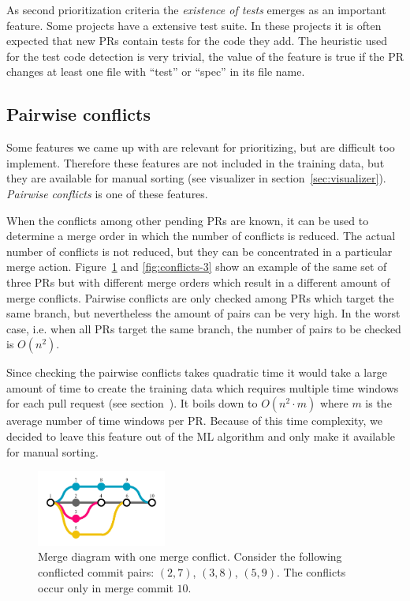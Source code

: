 \documentclass[conference]{IEEEtran}
\begin{document}
As second prioritization criteria the \emph{existence of tests} emerges as an important feature.
Some projects have a extensive test suite.
In these projects it is often expected that new PRs contain tests for the code they add.
The heuristic used for the test code detection is very trivial, the value of the feature is true if the PR changes at least one file with ``test'' or ``spec'' in its file name.

\subsection{Pairwise conflicts}
\label{sec:pairwise}

Some features we came up with are relevant for prioritizing, but are difficult too implement.
Therefore these features are not included in the training data, but they are available for manual sorting (see visualizer in section~\ref{sec:visualizer}).
\emph{Pairwise conflicts} is one of these features.

When the conflicts among other pending PRs are known, it can be used to determine a merge order in which the number of conflicts is reduced.
The actual number of conflicts is not reduced, but they can be concentrated in a particular merge action.
Figure~\ref{fig:conflicts-1} and \ref{fig:conflicts-3} show an example of the same set of three PRs but with different merge orders which result in a different amount of merge conflicts.
Pairwise conflicts are only checked among PRs which target the same branch, but nevertheless the amount of pairs can be very high.
In the worst case, i.e. when all PRs target the same branch, the number of pairs to be checked is $O(n^2)$.

Since checking the pairwise conflicts takes quadratic time it would take a large amount of time to create the training data which requires multiple time windows for each pull request (see section~\label{sec:training}).
It boils down to $O(n^2 \cdot m)$ where $m$ is the average number of time windows per PR.
Because of this time complexity, we decided to leave this feature out of the ML algorithm and only make it available for manual sorting.

\begin{figure}
  \centering
  \includegraphics[height=25mm, clip ,trim = 0mm 7mm 0mm 7mm]{../figs/conflicts-1.pdf}
  \caption[Merge diagram with one conflict]
   {Merge diagram with one merge conflict.
   Consider the following conflicted commit pairs: $(2,7)$, $(3,8)$, $(5,9)$.
   The conflicts occur only in merge commit $10$.}
  \label{fig:conflicts-1}
\end{figure}
\end{document}
